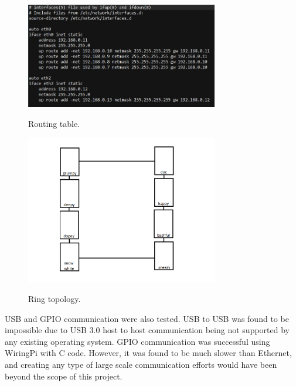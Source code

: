  \begin{figure}[tbh]
	\caption{Routing table.}
	\centering
		\includegraphics[width=0.75\textwidth]{routingtable.JPG}
	\label{fig:routing}
\end{figure}

 \begin{figure}[tbh]
	\caption{Ring topology.}
	\centering
		\includegraphics[width=0.75\textwidth]{ring.png}
	\label{fig:ring}
\end{figure}

USB and GPIO communication were also tested. USB to USB was found to be impossible due to USB 3.0 host to host communication being not supported by any existing operating system. GPIO communication was successful using WiringPi with C code. However, it was found to be much slower than Ethernet, and creating any type of large scale communication efforts would have been beyond the scope of this project.
 
 

